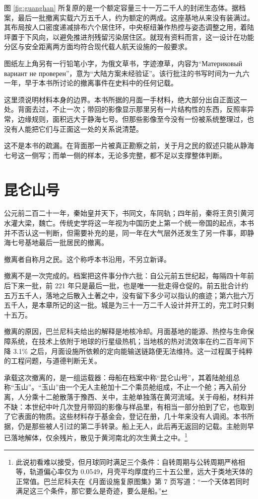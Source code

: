 图 \ref{fig:guanghan} 所复原的是一个额定容量三十一万二千人的封闭生态体。据档案，最后一批撤离实载六万五千人，约为额定的两成。这座基地从来没有装满过。其布局按人口密度递减排布六个居住环，中央枢纽兼作热控与姿态调整之用，着陆坪置于下风向，以避免推进剂残留污染居住区。就现有资料而言，这一设计在功能分区与安全距离两方面均符合现代载人航天设施的一般要求。

图纸左上角另有一行铅笔小字，为俄文草书，字迹潦草，内容为“Материко\-вый вариант не проверен”，意为“大陆方案未经验证”。该行批注的书写时间为一九六一年，早于本书所讨论的撤离事件在史料中的任何记载。

这里须说明材料本身的边界。本书所据的月面一手材料，绝大部分出自正面这一处。背面去过，不止一次；带回的影像显示那里另有一片结构性的东西，反照率异常，边缘规则，面积远大于静海七号。但那些影像至今没有一份被系统整理过，也没有人能把它们与正面这一处的关系说清楚。

这不是本书的疏漏。在背面那一片被真正勘察之前，关于月之民的叙述只能从静海七号这一侧写；而单一侧的样本，无论多完整，都不足以支撑整体判断。

\section{昆仑山号}

公元前二百二十一年，秦始皇并天下，书同文，车同轨；四年前，秦将王贲引黄河水灌大梁，魏亡。传统史学将这一年视为中国历史上第一个统一帝国的起点，本书并不否认这一判断，但需要补充的是，同一年在大气层外还发生了另一件事，即静海七号基地最后一批居民的撤离。

撤离者自称月之民。这个称呼本书沿用，不另立新译。

撤离不是一次完成的。档案把这件事分作六批：自公元前五世纪起，每隔四十年前后下来一批，前 221 年只是最后一批，也是唯一一批走得仓促的。前五批合计约五万五千人，落地之后散入土著之中，没有留下多少可以指认的痕迹；第六批六万五千人，是本章所记的这一批。城是为三十一万二千人设计并开工的，完工时只剩十五万。

撤离的原因，巴兰尼科夫给出的解释是地核冷却。月面基地的能源、热控与生命保障系统，在技术上依附于地球的行星级热机；当地核的热对流效率在约二百年间下降 3.1\% 之后，月面设施所依赖的定向能输送链路便无法维持。这一过程属于纯粹的工程问题，与道德判断无关。

承载这次撤离的，是一组运载器：母船在档案中称“昆仑山号”，其着陆舱组总称“玉山”。“玉山”由一个无人主舱加十二个乘员舱组成，不止一个舱；再入前分离，人分乘十二舱散落于豫西、关中，主舱单独落在黄河流域。关于母船，材料并不缺：本世纪中叶几次登月带回的影像与样品里，有相当一部分拍到了它，也取到了它表面的物质。这些材料存于基金会，登记在册，几十年来没有人调阅。本书所据，仍是那些被人引过的第二手转录。船上无人，此后再无返回的记载。主舱则早已落地解体，仅余残片，散见于黄河南北的次生黄土之中。\footnote{此说初看难以接受，但月球同时满足三个条件：自转周期与公转周期严格相等，轨道偏心率仅为 0.0549，月壳平均厚度约三十五公里，远大于类地天体的正常值。巴兰尼科夫在《月面设施复原图集》第 7 页写道：“一个天体若同时满足这三个条件，那它要么是奇迹，要么是船。”}

